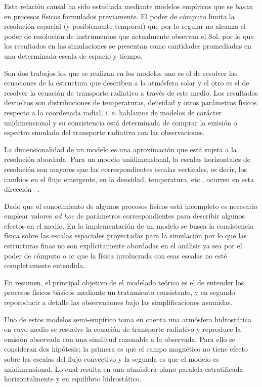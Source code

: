Esta relaci\'on causal ha sido estudiada mediante modelos emp\'iricos que se basan en procesos f\'isicos formulados previamente. El poder de c\'omputo limita la resoluci\'on espacial (y posiblemente temporal) que por lo regular no alcanza el poder de resoluci\'on de instrumentos que actualmente observan el Sol, por lo que los resultados en las simulaciones se presentan como cantidades promediadas en una determinada escala de espacio y tiempo. 

Son dos trabajos los que se realizan en los modelos uno es el de resolver las ecuaciones de la estructura que describen a la atm\'osfera solar y el otro es el de resolver la ecuaci\'on de transporte radiativo a trav\'es de este medio. Los resultados devueltos son distribuciones de temperaturas, densidad y otros par\'ametros f\'isicos  respecto a la coordenada radial, i. e. hablamos de modelos de car\'acter unidimensional y su consistencia est\'a determinada de comprar la emisi\'on o espectro simulado del transporte radiativo con las observaciones. 

La dimensionalidad de un modelo es una aproximaci\'on que est\'a sujeta a la resoluci\'on abordada. Para un modelo unidimensional, la escalas horizontales de resoluci\'on son mayores que las correspondientes escalas verticales, es decir, los cambios en el flujo emergente, en la densidad, temperatura, etc., ocurren en esta direcci\'on ~\citep{Fontenla2006}.

Dado que el conocimiento de algunos procesos f\'isicos est\'a incompleto es necesario emplear valores \emph{ad hoc} de par\'ametros correspondientes para describir algunos efectos en el medio. En la implementaci\'on de un modelo se busca la consistencia f\'isica sobre las escalas espaciales proyectadas para la simulaci\'on por lo que las estructuras finas no son expl\'icitamente abordadas en el an\'alisis ya sea por el poder de c\'omputo o or que la f\'isica involucrada con esas escalas no est\'e completamente entendida.

En resumen, el principal objetivo de el modelado te\'orico es el de entender los procesos f\'isicos b\'asicos mediante un tratamiento consistente, y en segundo reporoducir a detalle las observaciones bajo las simplificaciones asumidas.

Uno de estos modelos semi-emp\'irico toma en cuenta una atm\'osfera hidrost\'atica en cuyo medio se resuelve la ecuaci\'on de transporte radiativo y reproduce la emisi\'on observada con una similitud razonable a la observada. Para ello se consideran dos hip\'otesis; la primera es que el campo magn\'etico no tiene efecto sobre las escalas del flujo convectivo y la segunda es que el modelo es unidimensional. Lo cual resulta en una atm\'osfera plano-paralela estratificada horizontalmente y en equilibrio hidrost\'atico.

